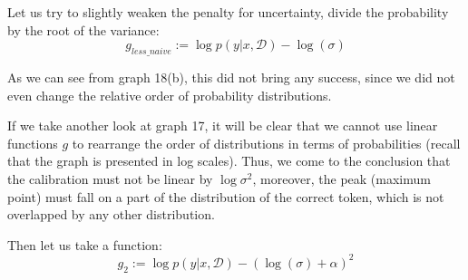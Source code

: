 \documentclass[a4paper,14pt]{extarticle}
\begin{document}
	Let us try to slightly weaken the penalty for uncertainty, divide the probability by the root of the variance:
	\begin{equation}
		g_{less\_naive} := \log p(y | x, \mathcal{D}) - \log(\sigma)
	\end{equation}
	
	As we can see from graph 18(b), this did not bring any success, since we did not even change the relative order of probability distributions.

	If we take another look at graph 17, it will be clear that we cannot use linear functions $g$ to rearrange the order of distributions in terms of probabilities (recall that the graph is presented in log scales). Thus, we come to the conclusion that the calibration must not be linear by $\log \sigma^2$, moreover, the peak (maximum point) must fall on a part of the distribution of the correct token, which is not overlapped by any other distribution.

	Then let us take a function:
	\begin{equation}
		g_{2} := \log p(y | x, \mathcal{D}) - (\log(\sigma) + \alpha)^2
	\end{equation}
	
\end{document}
